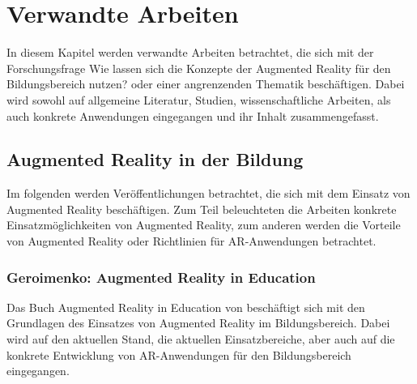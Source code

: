 \chapter{Verwandte Arbeiten}\label{chapter:arbeiten}
In diesem Kapitel werden verwandte Arbeiten betrachtet, die sich mit der Forschungsfrage \glqq Wie lassen sich die Konzepte der Augmented Reality für den Bildungsbereich nutzen?\grqq{} oder einer angrenzenden Thematik beschäftigen. Dabei wird sowohl auf allgemeine Literatur, Studien, wissenschaftliche Arbeiten, als auch konkrete Anwendungen eingegangen und ihr Inhalt zusammengefasst.


\section{Augmented Reality in der Bildung}
Im folgenden werden Veröffentlichungen betrachtet, die sich mit dem Einsatz von Augmented Reality beschäftigen. Zum Teil beleuchteten die Arbeiten konkrete Einsatzmöglichkeiten von Augmented Reality, zum anderen werden die Vorteile von Augmented Reality oder Richtlinien für AR-Anwendungen betrachtet.


\subsection{Geroimenko: Augmented Reality in Education}
Das Buch \glqq Augmented Reality in Education\grqq{} von \citeauthor{geroimenko:ar-in-education} beschäftigt sich mit den Grundlagen des Einsatzes von Augmented Reality im Bildungsbereich. Dabei wird auf den aktuellen Stand, die aktuellen Einsatzbereiche, aber auch auf die konkrete Entwicklung von AR-Anwendungen für den Bildungsbereich eingegangen. 

